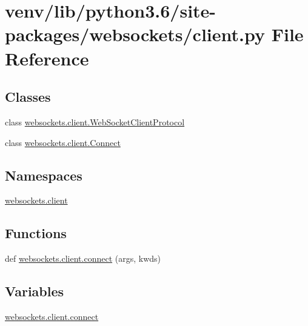 \hypertarget{venv_2lib_2python3_86_2site-packages_2websockets_2client_8py}{}\section{venv/lib/python3.6/site-\/packages/websockets/client.py File Reference}
\label{venv_2lib_2python3_86_2site-packages_2websockets_2client_8py}
\subsection*{Classes}
\begin{DoxyCompactItemize}
\item 
class \hyperlink{classwebsockets_1_1client_1_1_web_socket_client_protocol}{websockets.\+client.\+Web\+Socket\+Client\+Protocol}
\item 
class \hyperlink{classwebsockets_1_1client_1_1_connect}{websockets.\+client.\+Connect}
\end{DoxyCompactItemize}
\subsection*{Namespaces}
\begin{DoxyCompactItemize}
\item 
 \hyperlink{namespacewebsockets_1_1client}{websockets.\+client}
\end{DoxyCompactItemize}
\subsection*{Functions}
\begin{DoxyCompactItemize}
\item 
def \hyperlink{namespacewebsockets_1_1client_ae6f2dcca15f564106fee16e1e9b2e02f}{websockets.\+client.\+connect} (args, kwds)
\end{DoxyCompactItemize}
\subsection*{Variables}
\begin{DoxyCompactItemize}
\item 
\hyperlink{namespacewebsockets_1_1client_ac1e55c934195c17eecade33a4a9520a3}{websockets.\+client.\+connect}
\end{DoxyCompactItemize}
